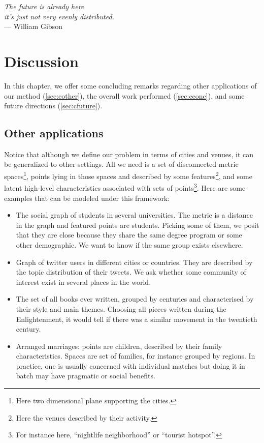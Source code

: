 \begin{flushright}{\slshape    
		The future is already here \\
		it's just not very evenly distributed.
    } \\ \medskip
    --- William Gibson
\end{flushright}

\bigskip

\begingroup
\let\clearpage\relax
\let\cleardoublepage\relax
\let\cleardoublepage\relax
\chapter{Discussion}
\label{chap:discussion}

In this chapter, we offer some concluding remarks regarding other applications
of our method (\autoref{sec:cother}), the overall work performed
(\autoref{sec:cconc}), and some future directions (\autoref{sec:cfuture}).

\section{Other applications}
\label{sec:cother}

Notice that although we define our problem in terms of cities and venues, it can
be generalized to other settings. All we need is a set of disconnected metric
spaces\footnote{Here two dimensional plane supporting the cities.}, points
lying in those spaces and described by some features\footnote{Here the venues
described by their activity.}, and some latent high-level characteristics
associated with sets of points\footnote{For instance here, \enquote{nightlife
neighborhood} or \enquote{tourist hotspot}.}. Here are some examples that
can be modeled under this framework:
\begin{itemize}
	\label{:more-problems}
	\item The social graph of students in several universities. The metric
		is a distance in the graph and featured points are students.
		Picking some of them, we posit that they are close because
		they share the same degree program or some other demographic.
		We want to know if the same group exists elsewhere.
	\item Graph of twitter users in different cities or countries. They
		are described by the topic distribution of their tweets. We
		ask whether some community of interest exist in several places
		in the world.
	\item The set of all books ever written, grouped by centuries and
		characterised by their style and main themes. Choosing all
		pieces written during the Enlightenment, it would tell if
		there was a similar movement in the twentieth century.
	\item Arranged marriages: points are children, described by their family
		characteristics. Spaces are set of families, for instance grouped by
		regions. In practice, one is usually concerned with individual matches
		but doing it in batch may have pragmatic or social
		benefits.
\end{itemize}

